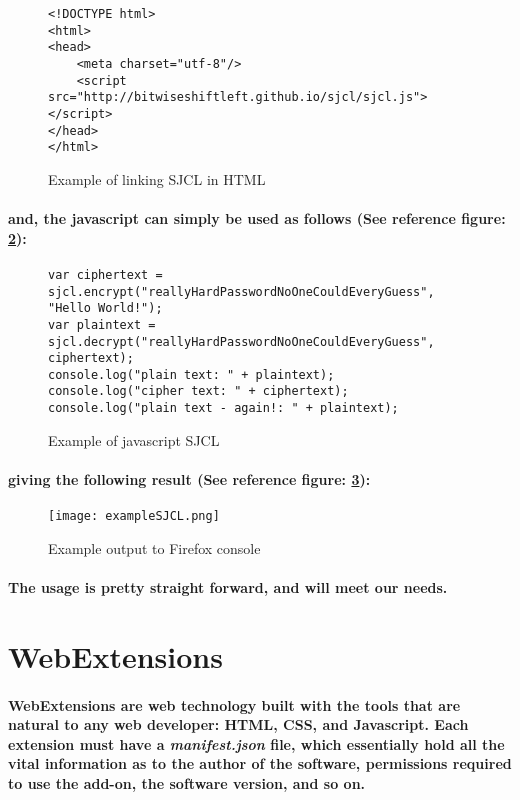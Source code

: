 \begin{figure}[H]
\begin{verbatim}
<!DOCTYPE html>
<html>
<head>
    <meta charset="utf-8"/>
    <script src="http://bitwiseshiftleft.github.io/sjcl/sjcl.js"></script>
</head>
</html>
\end{verbatim}
\caption{\label{fig: exampleSJCL_html} Example of linking SJCL in HTML}
\end{figure}

\paragraph{and, the javascript can simply be used as follows (See reference figure: \ref{fig: exampleSJCL_js}):}

\begin{figure}[H]
\centering
\begin{verbatim}
var ciphertext = sjcl.encrypt("reallyHardPasswordNoOneCouldEveryGuess", "Hello World!");
var plaintext = sjcl.decrypt("reallyHardPasswordNoOneCouldEveryGuess", ciphertext);
console.log("plain text: " + plaintext);
console.log("cipher text: " + ciphertext);
console.log("plain text - again!: " + plaintext);
\end{verbatim}
\caption{\label{fig: exampleSJCL_js} Example of javascript SJCL}
\end{figure}

\paragraph{giving the following result (See reference figure: \ref{fig: exampleSJCL}):}

\begin{figure}[H]
\centering
\texttt{[image: exampleSJCL.png]}
\caption{\label{fig: exampleSJCL} Example output to Firefox console}
\end{figure}

\paragraph{The usage is pretty straight forward, and will meet our needs.}

\section{WebExtensions}

\paragraph{WebExtensions are web technology built with the tools that are natural to any web developer: HTML, CSS, and Javascript. Each extension must have a \emph{manifest.json} file, which essentially hold all the vital information as to the author of the software, permissions required to use the add-on, the software version, and so on.} \cite[Webpage]{WebEx}

